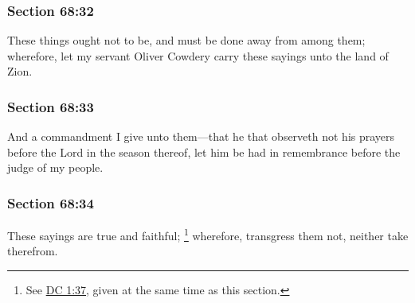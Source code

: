 	\subsubsection{Section 68:32} %
		\label{DC68-32}

		These things ought not to be, and must be done away from among them; wherefore, let my servant Oliver Cowdery carry these sayings unto the land of Zion.


	\subsubsection{Section 68:33} %
		\label{DC68-33}

		And a commandment I give unto them---that he that observeth not his prayers before the Lord in the season thereof, let him be had in remembrance before the judge of my people.


	\subsubsection{Section 68:34} %
		\label{DC68-34}

		These sayings are true and faithful;%
		\footnote{%
			See \hyperref[DC1-37]{DC 1:37}, given at the same time as this section.
			} 
		wherefore, transgress them not, neither take therefrom.



